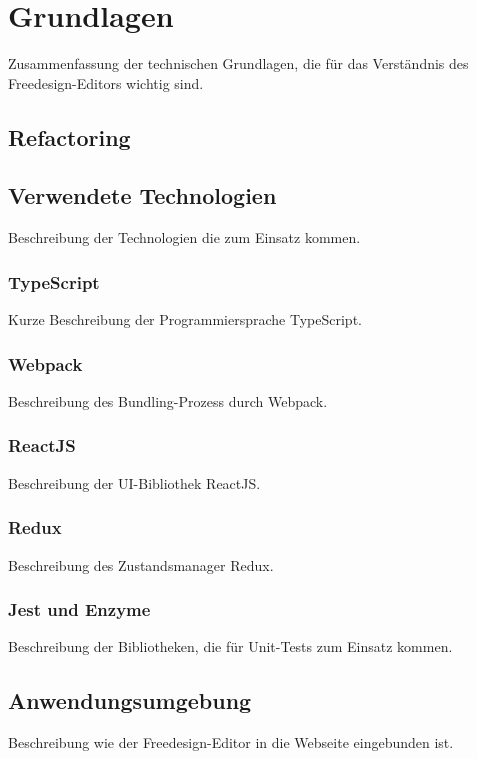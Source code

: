 \chapter{Grundlagen}
Zusammenfassung der technischen Grundlagen, die für das Verständnis des Freedesign-Editors wichtig sind.



\section{Refactoring}

\section{Verwendete Technologien}
Beschreibung der Technologien die zum Einsatz kommen.

\subsection{TypeScript}
Kurze Beschreibung der Programmiersprache TypeScript.

\subsection{Webpack}
Beschreibung des Bundling-Prozess durch Webpack.

\subsection{ReactJS}
Beschreibung der UI-Bibliothek ReactJS.

\subsection{Redux}
Beschreibung des Zustandsmanager Redux.

\subsection{Jest und Enzyme}
Beschreibung der Bibliotheken, die für Unit-Tests zum Einsatz kommen.

\section{Anwendungsumgebung}
Beschreibung wie der Freedesign-Editor in die Webseite eingebunden ist.

